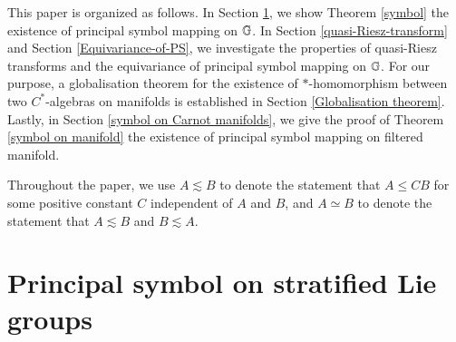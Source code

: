 \documentclass[leqno]{amsart}
\begin{document}
	
	
	
	
	
	This paper is organized as follows. 
	In Section \ref{principal-symbol}, we show Theorem \ref{symbol} the existence of principal symbol mapping on $\mathbb{G}$. 
	In Section \ref{quasi-Riesz-transform} and Section \ref{Equivariance-of-PS}, we investigate the properties of quasi-Riesz transforms and the equivariance of principal symbol mapping on $\mathbb{G}$.
	For our purpose, a globalisation theorem for the existence of $*$-homomorphism between two $C^{*}$-algebras on manifolds is established in Section \ref{Globalisation theorem}. 
	Lastly, in Section \ref{symbol on Carnot manifolds}, we give the proof of Theorem \ref{symbol on manifold} the existence of principal symbol mapping on filtered manifold.
	
	
	Throughout the paper, we use $A\lesssim B$ to denote the statement that $A\leq CB$ for some positive constant $C$ independent of $A$ and $B$, and $A\simeq B$ to denote the statement that $A\lesssim B$ and $B\lesssim A$.
	
	
	
	\section{Principal symbol on stratified Lie groups}\label{principal-symbol}
	
\end{document}
